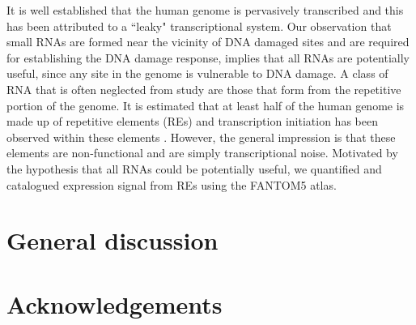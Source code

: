 \documentclass[10pt,a4paper]{report}
\begin{document}
It is well established that the human genome is pervasively transcribed and this has been attributed to a ``leaky" transcriptional system. Our observation that small RNAs are formed near the vicinity of DNA damaged sites and are required for establishing the DNA damage response, implies that all RNAs are potentially useful, since any site in the genome is vulnerable to DNA damage. A class of RNA that is often neglected from study are those that form from the repetitive portion of the genome. It is estimated that at least half of the human genome is made up of repetitive elements (REs) and transcription initiation has been observed within these elements \citep{pmid19377475}. However, the general impression is that these elements are non-functional and are simply transcriptional noise. Motivated by the hypothesis that all RNAs could be potentially useful, we quantified and catalogued expression signal from REs using the FANTOM5 atlas.



%

\chapter{General discussion}\label{discussion}


\chapter*{Acknowledgements}



%

\end{document}
